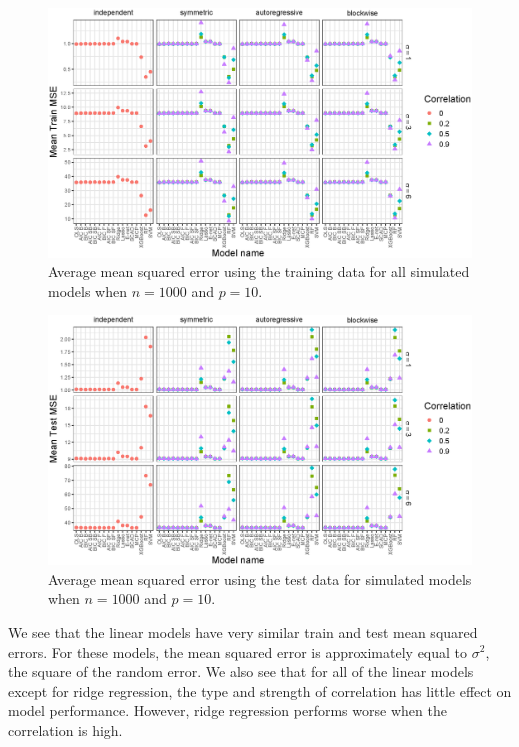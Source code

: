 \documentclass{article}
\begin{document}
\begin{figure}[b!]
	\centering
	\includegraphics[width = \textwidth]{images/facet-train-mse/facet_train_mse_1000_10.eps}
	\captionsetup{width = 0.8\textwidth}
	\caption{Average mean squared error using the training data for all simulated models when $n = 1000$ and $p = 10$.}
	\label{fig:train-mse-1000-10}
\end{figure}

\begin{figure}[t!]
	\centering
	\includegraphics[width = \textwidth]{images/facet-test-mse/facet_test_mse_1000_10.eps}
	\captionsetup{width = 0.8\textwidth}
	\caption{Average mean squared error using the test data for simulated models when $n = 1000$ and $p = 10$.}
	\label{fig:test-mse-1000-10}
\end{figure}

We see that the linear models have very similar train and test mean squared errors. For these models, the mean squared error is approximately equal to $\sigma^2$, the square of the random error. We also see that for all of the linear models except for ridge regression, the type and strength of correlation has little effect on model performance. However, ridge regression performs worse when the correlation is high.
\end{document}
